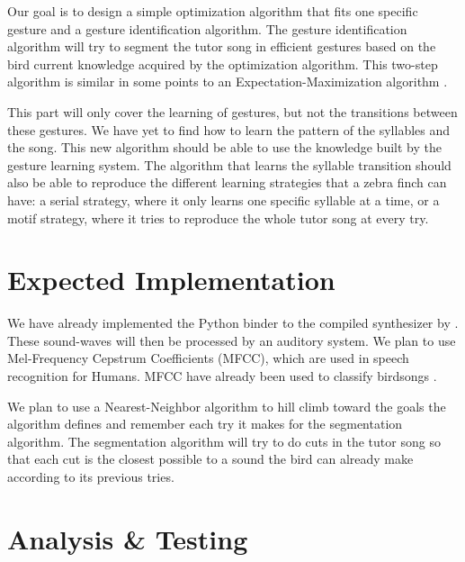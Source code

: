 \documentclass[a4paper]{article}
\begin{document}
\begin{multicols}{1}
Our goal is to design a simple optimization algorithm that fits one specific
gesture and a gesture identification algorithm. The gesture identification
algorithm will try to segment the tutor song in efficient gestures based on the
bird current knowledge acquired by the optimization algorithm. This two-step
algorithm is similar in some points to an Expectation-Maximization algorithm
\parencite{dempster_maximum_1977}.

This part will only cover the learning of gestures, but not the transitions
between these gestures. We have yet to find how to learn the pattern of the
syllables and the song. This new algorithm should be able to use the knowledge
built by the gesture learning system. The algorithm that learns the syllable
transition should also be able to reproduce the different learning strategies
that a zebra finch can have: a serial strategy, where it only learns one
specific syllable at a time, or a motif strategy, where it tries to reproduce
the whole tutor song at every try.


\section*{Expected Implementation}

We have already implemented the Python binder to the compiled synthesizer by
\textcite{boari_automatic_2015}. These sound-waves will then be processed by an
auditory system. We plan to use Mel-Frequency Cepstrum Coefficients (MFCC),
which are used in speech recognition for Humans. MFCC have already been used to
classify birdsongs \parencite{chou_studies_2008}.

We plan to use a Nearest-Neighbor algorithm to hill climb toward the goals the
algorithm defines and remember each try it makes for the segmentation algorithm.
The segmentation algorithm will try to do cuts in the tutor song so that each
cut is the closest possible to a sound the bird can already make according to
its previous tries.

\section*{Analysis \& Testing}


\end{multicols}
\end{document}

